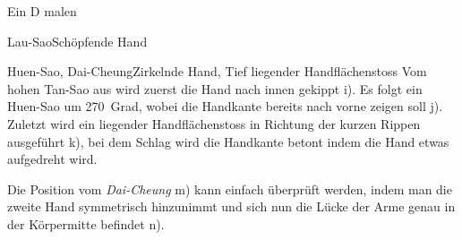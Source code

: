 \begin{WTSatz}{Ein D malen}
\begin{WTSatzTeil}{Lau-Sao}{Sch\"opfende Hand}
		
		
	\end{WTSatzTeil}
	\begin{WTSatzTeil}{Huen-Sao, Dai-Cheung}{Zirkelnde Hand, Tief liegender Handfl\"achenstoss}
		Vom hohen Tan-Sao aus wird zuerst die Hand nach innen gekippt i). Es folgt ein Huen-Sao um 270~Grad, wobei die Handkante bereits nach vorne zeigen soll j). Zuletzt wird ein liegender Handfl\"achenstoss in Richtung der kurzen Rippen ausgef\"uhrt k), bei dem Schlag wird die Handkante betont indem die Hand etwas aufgedreht wird.
		
		\begin{WTCommonPruefen}
		
			Die Position vom \textit{Dai-Cheung} m) kann einfach \"uberpr\"uft werden, indem man die zweite Hand symmetrisch hinzunimmt und sich nun die L\"ucke der Arme genau in der K\"orpermitte befindet n).
		\end{WTCommonPruefen}
		
	\end{WTSatzTeil}
\end{WTSatz}


